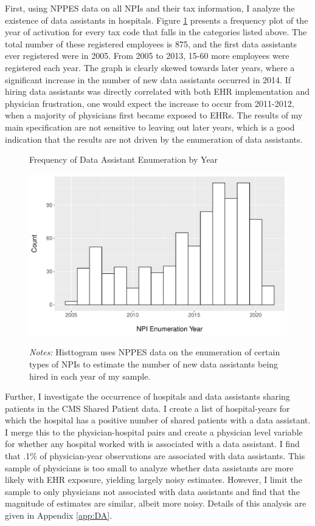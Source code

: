 \documentclass[12pt]{article}
\begin{document}
First, using NPPES data on all NPIs and their tax information, I analyze the existence of data assistants in hospitals. Figure \ref{fig:dataassistant_histogram} presents a frequency plot of the year of activation for every tax code that falls in the categories listed above. The total number of these registered employees is 875, and the first data assistants ever registered were in 2005. From 2005 to 2013, 15-60 more employees were registered each year. The graph is clearly skewed towards later years, where a significant increase in the number of new data assistants occurred in 2014. If hiring data assistants was directly correlated with both EHR implementation and physician frustration, one would expect the increase to occur from 2011-2012, when a majority of physicians first became exposed to EHRs. The results of my main specification are not sensitive to leaving out later years, which is a good indication that the results are not driven by the enumeration of data assistants. 

\begin{figure}[t]
\centering
\captionsetup{width=.5\linewidth}
\caption{Frequency of Data Assistant Enumeration by Year}
\includegraphics[scale=.5]{Objects/dataassistant_histogram.pdf}
\label{fig:dataassistant_histogram}
\vspace{2mm}
    \caption*{\footnotesize{\textit{Notes:} Histtogram uses NPPES data on the enumeration of certain types of NPIs to estimate the number of new data assistants being hired in each year of my sample.}}
\end{figure}

Further, I investigate the occurrence of hospitals and data assistants sharing patients in the CMS Shared Patient data. I create a list of hospital-years for which the hospital has a positive number of shared patients with a data assistant. I merge this to the physician-hospital pairs and create a physician level variable for whether any hospital worked with is associated with a data assistant. I find that .1\% of physician-year observations are associated with data assistants. This sample of physicians is too small to analyze whether data assistants are more likely with EHR exposure, yielding largely noisy estimates. However, I limit the sample to only physicians not associated with data assistants and find that the magnitude of estimates are similar, albeit more noisy. Details of this analysis are given in Appendix \ref{app:DA}. 
\end{document}
